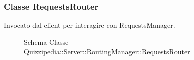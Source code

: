 \subsubsection{Classe RequestsRouter}
Invocato dal client per interagire con RequestsManager.
\begin{figure}[H]
\centering
\noindent{}
\caption[Schema Classe RequestsRouter]{Schema Classe Quizzipedia::Server::RoutingManager::RequestsRouter}
\end{figure}
